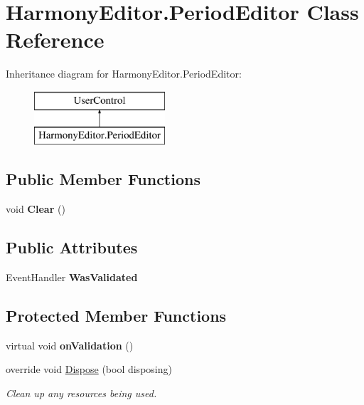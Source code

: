\hypertarget{class_harmony_editor_1_1_period_editor}{\section{Harmony\+Editor.\+Period\+Editor Class Reference}
\label{class_harmony_editor_1_1_period_editor}
}
Inheritance diagram for Harmony\+Editor.\+Period\+Editor\+:\begin{figure}[H]
\begin{center}
\leavevmode
\includegraphics[height=2.000000cm]{class_harmony_editor_1_1_period_editor}
\end{center}
\end{figure}
\subsection*{Public Member Functions}
\begin{DoxyCompactItemize}
\item 
\hypertarget{class_harmony_editor_1_1_period_editor_a2a45b4f705ce8a28f7b990b92dcc5593}{void {\bfseries Clear} ()}\label{class_harmony_editor_1_1_period_editor_a2a45b4f705ce8a28f7b990b92dcc5593}

\end{DoxyCompactItemize}
\subsection*{Public Attributes}
\begin{DoxyCompactItemize}
\item 
\hypertarget{class_harmony_editor_1_1_period_editor_a901ae3e8aa448a3243c61c13df752a05}{Event\+Handler {\bfseries Was\+Validated}}\label{class_harmony_editor_1_1_period_editor_a901ae3e8aa448a3243c61c13df752a05}

\end{DoxyCompactItemize}
\subsection*{Protected Member Functions}
\begin{DoxyCompactItemize}
\item 
\hypertarget{class_harmony_editor_1_1_period_editor_a7bc3928e2a891722774568f4c1391ec6}{virtual void {\bfseries on\+Validation} ()}\label{class_harmony_editor_1_1_period_editor_a7bc3928e2a891722774568f4c1391ec6}

\item 
override void \hyperlink{class_harmony_editor_1_1_period_editor_a71c11fbb8292b277a56cccce4542d957}{Dispose} (bool disposing)
\begin{DoxyCompactList}\small\item\em Clean up any resources being used. \end{DoxyCompactList}\end{DoxyCompactItemize}

